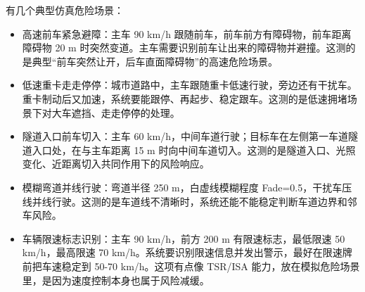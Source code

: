 有几个典型仿真危险场景：

\begin{itemize}
  \item 高速前车紧急避障：主车 90 km/h 跟随前车，前车前方有障碍物，前车距离障碍物 20 m 时突然变道。主车需要识别前车让出来的障碍物并避撞。这测的是典型“前车突然让开，后车直面障碍物”的高速危险场景。
  \item 低速重卡走走停停：城市道路中，主车跟随重卡低速行驶，旁边还有干扰车。重卡制动后又加速，系统要能跟停、再起步、稳定跟车。这测的是低速拥堵场景下对大车遮挡、走走停停的处理。
  \item 隧道入口前车切入：主车 60 km/h，中间车道行驶；目标车在左侧第一车道隧道入口处，在与主车距离 15 m 时向中间车道切入。这测的是隧道入口、光照变化、近距离切入共同作用下的风险响应。
  \item 模糊弯道并线行驶：弯道半径 250 m，白虚线模糊程度 Fade=0.5，干扰车压线并线行驶。这测的是车道线不清晰时，系统还能不能稳定判断车道边界和邻车风险。
  \item 车辆限速标志识别：主车 90 km/h，前方 200 m 有限速标志，最低限速 50 km/h，最高限速 70 km/h。系统要识别限速信息并发出警示，最好在限速牌前把车速稳定到 50-70 km/h。这项有点像 TSR/ISA 能力，放在模拟危险场景里，是因为速度控制本身也属于风险减缓。
\end{itemize}